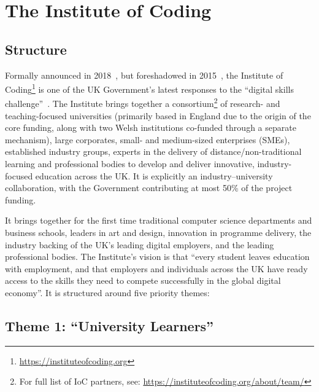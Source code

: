 \documentclass[conference]{IEEEtran}
\begin{document}
\section{The Institute of Coding}\label{ioc}

\subsection{Structure}

Formally announced in 2018~\cite{DfE2018a}, but foreshadowed in
2015~\cite{HMG2015a}, the Institute of
Coding\footnote{\url{https://instituteofcoding.org}} is one of the UK
Government's latest responses to the ``digital skills
challenge''~\cite{davenport-et-al:cep2019}. The Institute brings
together a consortium\footnote{For full list of IoC partners, see:
\url{https://instituteofcoding.org/about/team/}} of research- and
teaching-focused universities (primarily based in England due to the
origin of the core funding, along with two Welsh institutions
co-funded through a separate mechanism), large corporates, small- and
medium-sized enterprises (SMEs), established industry groups, experts
in the delivery of distance/non-traditional learning and professional
bodies to develop and deliver innovative, industry-focused education
across the UK. It is explicitly an industry--university collaboration,
with the Government contributing at most 50\% of the project funding.

It brings together for the first time traditional computer science
departments and business schools, leaders in art and design,
innovation in programme delivery, the industry backing of the UK's
leading digital employers, and the leading professional bodies.  The
Institute's vision is that ``every student leaves education with
employment, and that employers and individuals across the UK have
ready access to the skills they need to compete successfully in the
global digital economy''. It is structured around five priority
themes:

\subsection{Theme 1: ``University Learners''}

\end{document}
